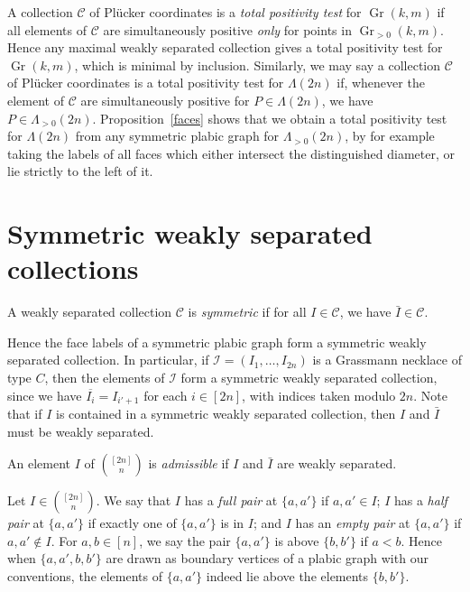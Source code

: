 \documentclass[ALCO,ThmDefs,Unicode,epreuves]{cedram}
\DeclareMathOperator{\Gr}{Gr}
\newcommand{\Lm}{\Lambda}
\begin{document}
A collection $\mathcal{C}$ of Pl{\"u}cker coordinates is a \emph{total positivity test} for $\Gr(k,m)$ if all elements of $\mathcal{C}$ are simultaneously positive \emph{only} for points in $\Gr_{> 0}(k,m)$.
Hence any maximal weakly separated collection gives a total positivity test for $\Gr(k,m)$, which is minimal by inclusion. Similarly, we may say a collection $\mathcal{C}$ of Pl{\"u}cker coordinates is a total positivity test for $\Lm(2n)$ if, whenever the element of $\mathcal{C}$ are simultaneously positive for $P \in \Lm(2n)$, we have $P \in \Lm_{>0}(2n)$. Proposition~\ref{faces} shows that we obtain a total positivity test for $\Lm(2n)$ from any symmetric plabic graph for $\Lm_{>0}(2n)$, by for example taking the labels of all faces which either intersect the distinguished diameter, or lie strictly to the left of it. 

\section{Symmetric weakly separated collections}
\label{sym_sep}

\begin{defi}
A weakly separated collection $\mathcal{C}$ is \emph{symmetric} if for all $I \in \mathcal{C}$, we have $\bar{I} \in \mathcal{C}$.
\end{defi}

Hence the face labels of a symmetric plabic graph form a symmetric weakly separated collection. In particular, if $\mathcal{I}=(I_1,\ldots,I_{2n})$ is a Grassmann necklace of type $C$, then the elements of $\mathcal{I}$ form a symmetric weakly separated collection, since we have $\overline{I_i} = I_{i' + 1}$ for each $i \in [2n]$, with indices taken modulo $2n$. Note that if $I$ is contained in a symmetric weakly separated collection, then $I$ and $\bar{I}$ must be weakly separated.

\begin{defi}
An element $I$ of $\binom{[2n]}{n}$ is \emph{admissible} if $I$ and $\bar{I}$ are weakly separated.
\end{defi} 

Let $I \in \binom{[2n]}{n}$. We say that $I$ has a \emph{full pair} at $\{a,a'\}$ if $a,a' \in I$; $I$ has a \emph{half pair} at
 $\{a,a'\}$ if exactly one of
 $\{a,a'\}$ is in $I$; and $I$ has an \emph{empty pair} at
 $\{a,a'\}$ if $a,a' \not\in I$. 
 For $a,b \in [n]$, we say the pair $\{a,a'\}$ is above $\{b,b'\}$ if $a < b$. Hence when $\{a,a',b,b'\}$ are drawn as boundary vertices of a plabic graph with our conventions, the elements of
 $\{a,a'\}$ indeed lie above the elements $\{b,b'\}$. 
\end{document}
